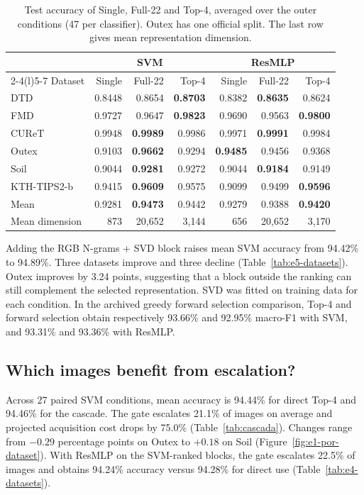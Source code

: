 \documentclass[10pt,a4paper,fleqn]{article}
\begin{document}
\begin{table}[htbp]
\centering
\caption{Test accuracy of Single, Full-22 and Top-4, averaged over the outer conditions (47 per classifier). Outex has one official split. The last row gives mean representation dimension.}
\label{tab:top4}
\begin{tabular}{@{}lrrrrrr@{}}
\toprule
 & \multicolumn{3}{c}{SVM} & \multicolumn{3}{c}{ResMLP} \\
\cmidrule(lr){2-4}\cmidrule(l){5-7}
Dataset & Single & Full-22 & Top-4 & Single & Full-22 & Top-4 \\
\midrule
DTD & 0.8448 & 0.8654 & \textbf{0.8703} & 0.8382 & \textbf{0.8635} & 0.8624 \\
FMD & 0.9727 & 0.9647 & \textbf{0.9823} & 0.9690 & 0.9563 & \textbf{0.9800} \\
CUReT & 0.9948 & \textbf{0.9989} & 0.9986 & 0.9971 & \textbf{0.9991} & 0.9984 \\
Outex & 0.9103 & \textbf{0.9662} & 0.9294 & \textbf{0.9485} & 0.9456 & 0.9368 \\
Soil & 0.9044 & \textbf{0.9281} & 0.9272 & 0.9044 & \textbf{0.9184} & 0.9149 \\
KTH-TIPS2-b & 0.9415 & \textbf{0.9609} & 0.9575 & 0.9099 & 0.9499 & \textbf{0.9596} \\
\midrule
Mean & 0.9281 & \textbf{0.9473} & 0.9442 & 0.9279 & 0.9388 & \textbf{0.9420} \\
Mean dimension & 873 & 20,652 & 3,144 & 656 & 20,652 & 3,170 \\
\bottomrule
\end{tabular}
\end{table}

Adding the RGB N-grams + SVD block raises mean SVM accuracy from 94.42\% to 94.89\%. Three datasets improve and three decline (Table~\ref{tab:e5-datasets}). Outex improves by 3.24 points, suggesting that a block outside the ranking can still complement the selected representation. SVD was fitted on training data for each condition. In the archived greedy forward selection comparison, Top-4 and forward selection obtain respectively 93.66\% and 92.95\% macro-F1 with SVM, and 93.31\% and 93.36\% with ResMLP.

\subsection{Which images benefit from escalation?}

Across 27 paired SVM conditions, mean accuracy is 94.44\% for direct Top-4 and 94.46\% for the cascade. The gate escalates 21.1\% of images on average and projected acquisition cost drops by 75.0\% (Table~\ref{tab:cascada}). Changes range from $-0.29$ percentage points on Outex to $+0.18$ on Soil (Figure~\ref{fig:e1-por-dataset}). With ResMLP on the SVM-ranked blocks, the gate escalates 22.5\% of images and obtains 94.24\% accuracy versus 94.28\% for direct use (Table~\ref{tab:e4-datasets}).
\end{document}
